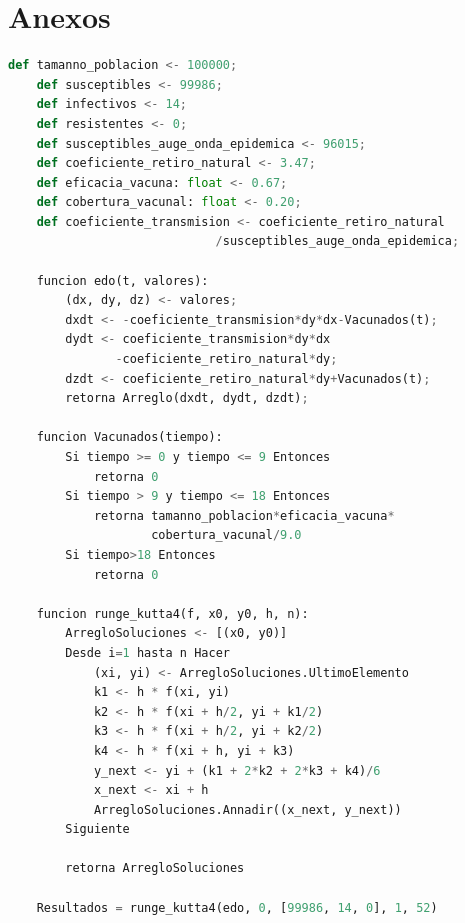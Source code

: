 \documentclass{wscpaperproc}
\theoremstyle{wsc}
\begin{document}
\section{Anexos} \label{app:quadratic}
\begin{lstlisting}[language=python]
	def tamanno_poblacion <- 100000;
	def susceptibles <- 99986;
	def infectivos <- 14;
	def resistentes <- 0;
	def susceptibles_auge_onda_epidemica <- 96015;
	def coeficiente_retiro_natural <- 3.47;
	def eficacia_vacuna: float <- 0.67;
	def cobertura_vacunal: float <- 0.20;
	def coeficiente_transmision <- coeficiente_retiro_natural
		                     /susceptibles_auge_onda_epidemica;
	
	funcion edo(t, valores):
	 	(dx, dy, dz) <- valores;
		dxdt <- -coeficiente_transmision*dy*dx-Vacunados(t);
		dydt <- coeficiente_transmision*dy*dx
			   -coeficiente_retiro_natural*dy;
		dzdt <- coeficiente_retiro_natural*dy+Vacunados(t);
		retorna Arreglo(dxdt, dydt, dzdt);
	
	funcion Vacunados(tiempo):
		Si tiempo >= 0 y tiempo <= 9 Entonces
			retorna 0
		Si tiempo > 9 y tiempo <= 18 Entonces
			retorna tamanno_poblacion*eficacia_vacuna*
					cobertura_vacunal/9.0
		Si tiempo>18 Entonces
			retorna 0
	
	funcion runge_kutta4(f, x0, y0, h, n):
		ArregloSoluciones <- [(x0, y0)]
		Desde i=1 hasta n Hacer
			(xi, yi) <- ArregloSoluciones.UltimoElemento
			k1 <- h * f(xi, yi)
			k2 <- h * f(xi + h/2, yi + k1/2)
			k3 <- h * f(xi + h/2, yi + k2/2)
			k4 <- h * f(xi + h, yi + k3)
			y_next <- yi + (k1 + 2*k2 + 2*k3 + k4)/6
			x_next <- xi + h
			ArregloSoluciones.Annadir((x_next, y_next))
		Siguiente	

		retorna ArregloSoluciones

	Resultados = runge_kutta4(edo, 0, [99986, 14, 0], 1, 52)

\end{lstlisting}
\end{document}
